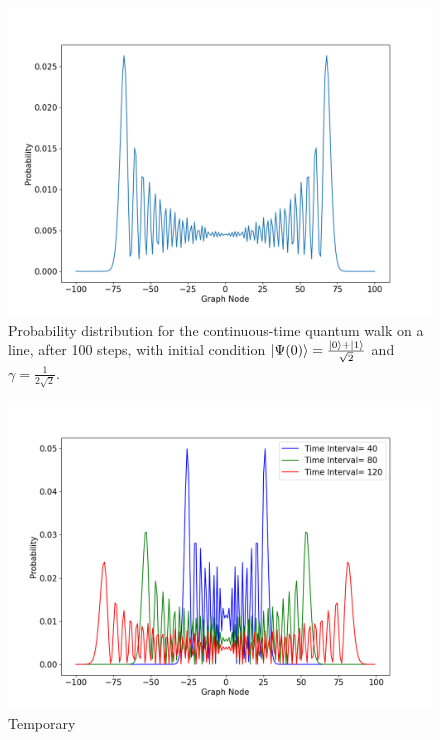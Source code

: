                \begin{figure}[!h]
                    \centering
                    \includegraphics[scale=0.40]{img/ContQW/ctqwSingleSup.png}
                    \caption{Probability distribution for the continuous-time quantum walk on a line, after 100 steps, with initial condition $\ket{\Psi(0)}=\frac{\ket{0}+\ket{1}}{\sqrt{2}}$ and $\gamma=\frac{1}{2\sqrt{2}}$.} 
                    \label{fig:contdist2}
                \end{figure}
                
                \begin{figure}[!h]
                    \centering
                    \includegraphics[scale=0.40]{img/ContQW/ctqwMultipleTime.png}
                    \caption{Temporary} 
                    \label{fig:contdist2}
                \end{figure}
                
